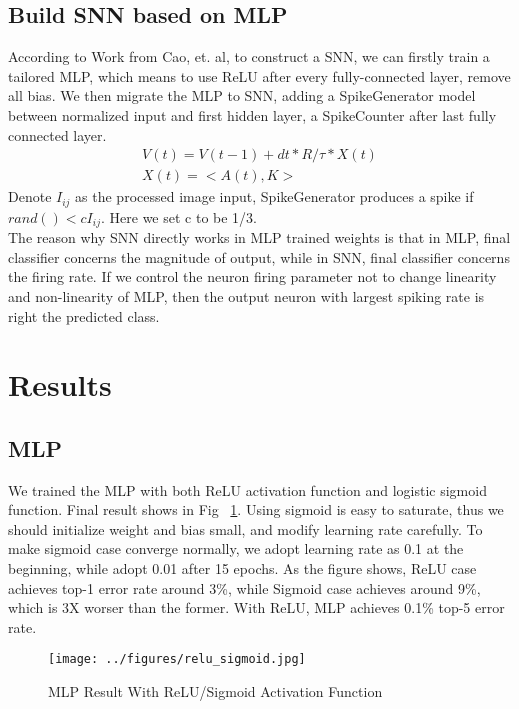 \documentclass[10pt,twocolumn,letterpaper]{article}
\begin{document}
\subsection{Build SNN based on MLP}
According to Work from Cao, et. al, to construct a SNN, we can firstly train a tailored MLP, which means to use ReLU after every fully-connected layer, remove all bias. We then migrate the MLP to SNN, adding a SpikeGenerator model between normalized input and first hidden layer, a SpikeCounter after last fully connected layer.
\begin{eqnarray}
V(t) = V(t-1) + dt*R/\tau*X(t) \\
X(t) = <A(t), K>
\end{eqnarray}
Denote $I_{ij}$ as the processed image input, SpikeGenerator produces a spike if $rand() < c I_{ij}$. Here we set c to be 1/3.\\

The reason why SNN directly works in MLP trained weights is that in MLP, final classifier concerns  the magnitude of output, while in SNN, final classifier concerns the firing rate. If we control the neuron firing parameter not to change linearity and non-linearity of MLP, then the output neuron with largest spiking rate is right the predicted class.


\section{Results}
\subsection{ MLP }
We trained the MLP with both ReLU activation function and logistic sigmoid function. Final result shows in Fig ~\ref{fig:mlp}. Using sigmoid is easy to saturate, thus we should initialize weight and bias small, and modify learning rate carefully. To make sigmoid case converge normally, we adopt learning rate as 0.1 at the beginning, while adopt 0.01 after 15 epochs. As the figure shows, ReLU case achieves top-1 error rate around 3\%, while Sigmoid case achieves around 9\%, which is 3X  worser than the former. With ReLU, MLP achieves 0.1\% top-5 error rate.

\begin{figure}[t]
\begin{center}
   \texttt{[image: ../figures/relu\_sigmoid.jpg]}
\end{center}
   \caption{MLP Result With ReLU/Sigmoid Activation Function}
\label{fig:mlp}
\end{figure}
\end{document}
